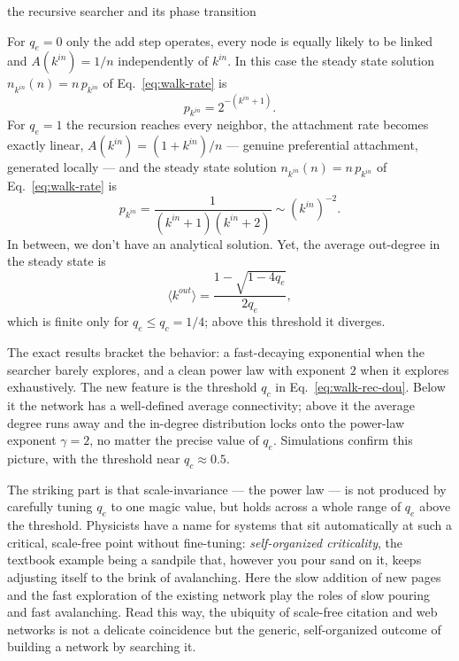 \begin{calculation}{the recursive searcher and its phase transition}

For $q_e=0$ only the add step operates, every node is equally likely to be 
linked and $A(k^{in}) = 1/n$ independently of $k^{in}$. In this case the 
steady state solution $n_{k^{in}}(n) = n\, p_{k^{in}}$ of Eq.~\eqref{eq:walk-rate} is
%
\begin{equation}
  p_{k^{in}} = 2^{-(k^{in}+1)}.
  \label{eq:walk-rec0}
\end{equation}
%
For $q_e=1$ the recursion reaches every neighbor, the attachment rate becomes 
exactly linear, $A(k^{in})=(1+k^{in})/n$ --- genuine preferential attachment, 
generated locally --- and the steady state solution $n_{k^{in}}(n) = n\, p_{k^{in}}$ of Eq.~\eqref{eq:walk-rate} is
%
\begin{equation}
  p_{k^{in}} = \frac{1}{(k^{in}+1)(k^{in}+2)} \sim (k^{in})^{-2}.
  \label{eq:walk-rec1}
\end{equation}
%
In between, we don't have an analytical solution. Yet, the average out-degree 
in the steady state is
%
\begin{equation}
  \langle k^{out}\rangle = \frac{1 - \sqrt{1-4 q_e}}{2 q_e},
  \label{eq:walk-rec-dou}
\end{equation}
which is finite only for $q_e \le q_c = 1/4$; above this threshold it diverges.
\end{calculation}

The exact results bracket the behavior: a fast-decaying exponential when the
searcher barely explores, and a clean power law with exponent $2$ when it
explores exhaustively. The new feature is the threshold $q_c$ in
Eq.~\eqref{eq:walk-rec-dou}. Below it the network has a well-defined average
connectivity; above it the average degree runs away and the in-degree
distribution locks onto the power-law exponent $\gamma=2$, no matter the precise
value of $q_e$. Simulations confirm this picture, with the threshold near $q_c
\approx 0.5$.

The striking part is that scale-invariance --- the power law --- is not produced
by carefully tuning $q_e$ to one magic value, but holds across a whole range of
$q_e$ above the threshold. Physicists have a name for systems that sit
automatically at such a critical, scale-free point without fine-tuning:
\emph{self-organized criticality}, the textbook example being a sandpile that,
however you pour sand on it, keeps adjusting itself to the brink of avalanching.
Here the slow addition of new pages and the fast exploration of the existing
network play the roles of slow pouring and fast avalanching. Read this way, the
ubiquity of scale-free citation and web networks is not a delicate coincidence
but the generic, self-organized outcome of building a network by searching it.

